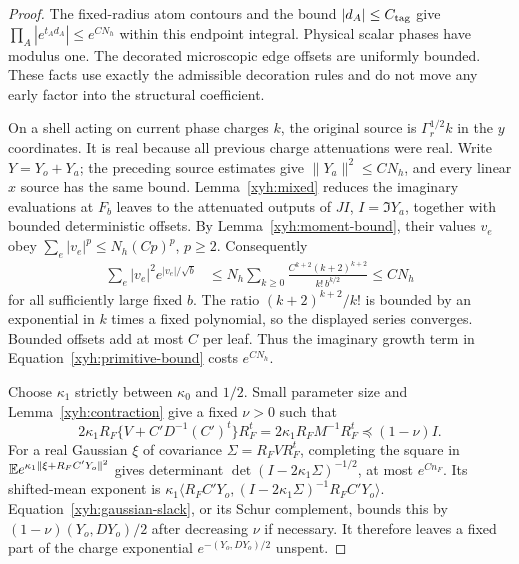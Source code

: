 \begin{proof}
The fixed-radius atom contours and the bound $|d_A|\le C_{\rm tag}$ give
$\prod_A|e^{t_A d_A}|\le e^{CN_h}$ within this endpoint integral.
Physical scalar phases have modulus one. The decorated microscopic edge
offsets are uniformly bounded. These facts use exactly the admissible
decoration rules and do not move any early factor into the structural
coefficient.

On a shell acting on current phase charges $k$, the original source is
$\Gamma_r^{1/2}k$ in the $y$ coordinates. It is real because all previous
charge attenuations were real. Write $Y=Y_o+Y_a$; the preceding source
estimates give $\|Y_a\|^2\le CN_h$, and every linear $x$ source has the
same bound. Lemma~\ref{xyh:mixed} reduces the imaginary evaluations at
$F_b$ leaves to the attenuated outputs of $JI$, $I=\Im Y_a$, together
with bounded deterministic offsets. By Lemma~\ref{xyh:moment-bound}, their
values $v_e$ obey
$\sum_e|v_e|^p\le N_h(Cp)^p$, $p\ge2$. Consequently
\begin{align}\label{xyh:imaginary-payment}
 \sum_e |v_e|^2 e^{|v_e|/\sqrt b}
 &\le N_h\sum_{k\ge0}
 \frac{C^{k+2}(k+2)^{k+2}}{k!\,b^{k/2}}
 \le CN_h
\end{align}
for all sufficiently large fixed $b$. The ratio
$(k+2)^{k+2}/k!$ is bounded by an exponential in $k$ times a fixed
polynomial, so the displayed series converges. Bounded offsets add at
most $C$ per leaf. Thus the imaginary growth term in
Equation~\eqref{xyh:primitive-bound} costs $e^{CN_h}$.

Choose $\kappa_1$ strictly between $\kappa_0$ and $1/2$. Small parameter
size and Lemma~\ref{xyh:contraction} give a fixed $\nu>0$ such that
\begin{equation}\label{xyh:gaussian-slack}
 2\kappa_1R_F\{V+C'D^{-1}(C')^t\}R_F^t
   =2\kappa_1R_FM^{-1}R_F^t\preceq(1-\nu)I.
\end{equation}
For a real Gaussian $\xi$ of covariance $\Sigma=R_FVR_F^t$, completing
the square in
$\mathbb E e^{\kappa_1\|\xi+R_FC'Y_o\|^2}$ gives determinant
$\det(I-2\kappa_1\Sigma)^{-1/2}$, at most $e^{Cn_F}$.
Its shifted-mean exponent is
$\kappa_1\langle R_FC'Y_o,(I-2\kappa_1\Sigma)^{-1}R_FC'Y_o\rangle$.
Equation~\eqref{xyh:gaussian-slack}, or its Schur complement, bounds this
by $(1-\nu)(Y_o,DY_o)/2$ after decreasing $\nu$ if necessary.
It therefore leaves a fixed part of the charge exponential
$e^{-(Y_o,DY_o)/2}$ unspent.


\end{proof}
